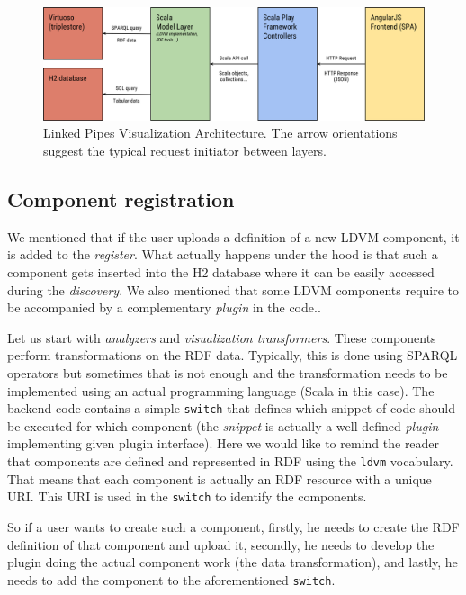 \begin{figure}
	\centering
	\includegraphics[width=140mm]{img/03_linked_pipes_visualization_architecture.png}
	\caption{Linked Pipes Visualization Architecture. The arrow orientations suggest the typical request initiator between layers.} 
	\label{fig:linked-pipes-visualization-architecture}
\end{figure}

\subsection{Component registration}
\label{sec:linkedpipes:component_registration}

We mentioned that if the user uploads a definition of a new LDVM component, it is added to the \emph{register}. What actually happens under the hood is that such a component gets inserted into the H2 database where it can be easily accessed during the \emph{discovery}. We also mentioned that some LDVM components require to be accompanied by a complementary \emph{plugin} in the code..

Let us start with \emph{analyzers} and \emph{visualization transformers}. These components perform transformations on the RDF data. Typically, this is done using SPARQL operators but sometimes that is not enough and the transformation needs to be implemented using an actual programming language (Scala in this case). The backend code contains a simple \texttt{switch} that defines which snippet of code should be executed for which component (the \emph{snippet} is actually a well-defined \emph{plugin} implementing given plugin interface). Here we would like to remind the reader that components are defined and represented in RDF using the \texttt{ldvm} vocabulary. That means that each component is actually an RDF resource with a unique URI. This URI is used in the \texttt{switch} to identify the components. 

So if a user wants to create such a component, firstly, he needs to create the RDF definition of that component and upload it, secondly, he needs to develop the plugin doing the actual component work (the data transformation), and lastly, he needs to add the component to the aforementioned \texttt{switch}. 

